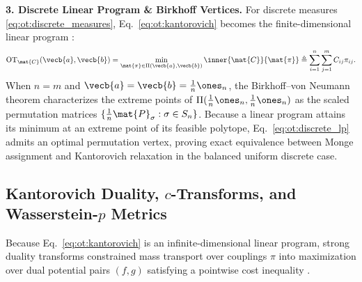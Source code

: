 \documentclass[../../../../master.tex]{subfiles}
\begin{document}
\begin{coremath}
\textbf{3. Discrete Linear Program \& Birkhoff Vertices.} For discrete measures \eqref{eq:ot:discrete_measures}, Eq.~\eqref{eq:ot:kantorovich} becomes the finite-dimensional linear program  :
\begin{equation}
\label{eq:ot:discrete_lp}
  \mathrm{OT}_{\mat{C}}(\vecb{a}, \vecb{b}) = \min_{\mat{\pi} \in \Pi(\vecb{a}, \vecb{b})} \inner{\mat{C}}{\mat{\pi}} \triangleq \sum_{i=1}^n \sum_{j=1}^m C_{ij}\pi_{ij}.
\end{equation}
When $n = m$ and $\vecb{a} = \vecb{b} = \frac{1}{n}\ones_n$, the Birkhoff--von Neumann theorem characterizes the extreme points of $\Pi(\frac{1}{n}\ones_n, \frac{1}{n}\ones_n)$ as the scaled permutation matrices $\{\frac{1}{n}\mat{P}_\sigma : \sigma \in S_n\}$. Because a linear program attains its minimum at an extreme point of its feasible polytope, Eq.~\eqref{eq:ot:discrete_lp} admits an optimal permutation vertex, proving exact equivalence between Monge assignment and Kantorovich relaxation in the balanced uniform discrete case.
\end{coremath}

\subsection{Kantorovich Duality, $c$-Transforms, and Wasserstein-$p$ Metrics}
\label{sec:ot:duality_wasserstein}

Because Eq.~\eqref{eq:ot:kantorovich} is an infinite-dimensional linear program, strong duality transforms constrained mass transport over couplings $\pi$ into maximization over dual potential pairs $(f, g)$ satisfying a pointwise cost inequality .
\end{document}
